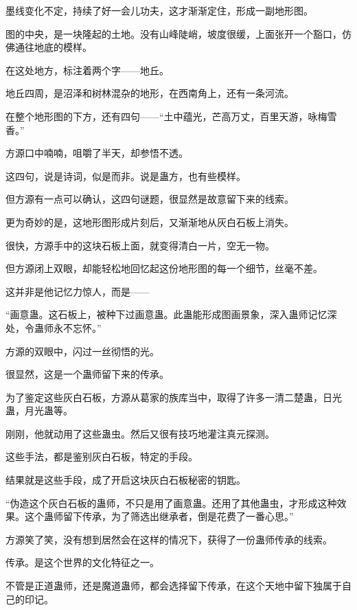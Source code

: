 
\begin{this_body}



墨线变化不定，持续了好一会儿功夫，这才渐渐定住，形成一副地形图。

图的中央，是一块隆起的土地。没有山峰陡峭，坡度很缓，上面张开一个豁口，仿佛通往地底的模样。

在这处地方，标注着两个字——地丘。

地丘四周，是沼泽和树林混杂的地形，在西南角上，还有一条河流。

在整个地形图的下方，还有四句——“土中蕴光，芒高万丈，百里天游，咏梅雪香。”

方源口中喃喃，咀嚼了半天，却参悟不透。

这四句，说是诗词，似是而非。说是蛊方，也有些模样。

但方源有一点可以确认，这四句谜题，很显然是故意留下来的线索。

更为奇妙的是，这地形图形成片刻后，又渐渐地从灰白石板上消失。

很快，方源手中的这块石板上面，就变得清白一片，空无一物。

但方源闭上双眼，却能轻松地回忆起这份地形图的每一个细节，丝毫不差。

这并非是他记忆力惊人，而是——

“画意蛊。这石板上，被种下过画意蛊。此蛊能形成图画景象，深入蛊师记忆深处，令蛊师永不忘怀。”

方源的双眼中，闪过一丝彻悟的光。

很显然，这是一个蛊师留下来的传承。

为了鉴定这些灰白石板，方源从葛家的族库当中，取得了许多一清二楚蛊，日光蛊，月光蛊等。

刚刚，他就动用了这些蛊虫。然后又很有技巧地灌注真元探测。

这些手法，都是鉴别灰白石板，特定的手段。

结果就是这些手段，成了开启这块灰白石板秘密的钥匙。

“伪造这个灰白石板的蛊师，不只是用了画意蛊。还用了其他蛊虫，才形成这种效果。这个蛊师留下传承，为了筛选出继承者，倒是花费了一番心思。”

方源笑了笑，没有想到居然会在这样的情况下，获得了一份蛊师传承的线索。

传承。是这个世界的文化特征之一。

不管是正道蛊师，还是魔道蛊师，都会选择留下传承，在这个天地中留下独属于自己的印记。


\end{this_body}
